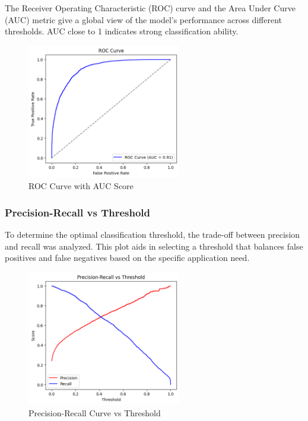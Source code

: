 \documentclass[a4paper,12pt]{article}
\begin{document}
The Receiver Operating Characteristic (ROC) curve and the Area Under Curve (AUC) metric give a global view of the model's performance across different thresholds. AUC close to 1 indicates strong classification ability.

\begin{figure}[H]
    \centering
    \includegraphics[width=0.6\textwidth]{Q3_2.png}
    \caption{ROC Curve with AUC Score}
\end{figure}
\newpage
\subsubsection*{Precision-Recall vs Threshold}

To determine the optimal classification threshold, the trade-off between precision and recall was analyzed. This plot aids in selecting a threshold that balances false positives and false negatives based on the specific application need.

\begin{figure}[H]
    \centering
    \includegraphics[width=0.6\textwidth]{Q3_3.png}
    \caption{Precision-Recall Curve vs Threshold}
\end{figure}
\end{document}
